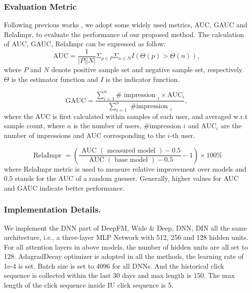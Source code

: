 \subsubsection{\textbf{Evaluation Metric}}
Following previous works \cite{din,dien,star,clid}, we adopt some widely used metrics, AUC, GAUC and RelaImpr, to evaluate the performance of our proposed method. 
The calculation of AUC, GAUC, RelaImpr can be expressed as follow:
\begin{equation}
\mathrm{AUC}=\frac{1}{|P||N|} \Sigma_{p \in P} \Sigma_{n \in N} I(\Theta(p)>\Theta(n)),
\end{equation}
where $P$ and $N$ denote positive sample set and negative sample set, respectively. $\Theta$ is the estimator function and $I$ is the indicator function.

\begin{equation}
\mathrm{GAUC}=\frac{\sum_{i=1}^n \# \text { impression }_i \times \mathrm{AUC}_i}{\sum_{i=1}^n \text { \#impression }_i},
\end{equation}
where the AUC is first calculated within samples of each user, and averaged w.r.t sample count, where $n$ is the number of users, \#impression $i$ and $\mathrm{AUC}_i$ are the number of impressions and AUC corresponding to the $i$-th user.

\begin{equation}
\text { RelaImpr }=\left(\frac{\text { AUC }(\text { measured model })-0.5}{\text { AUC }(\text { base model })-0.5}-1\right) \times 100 \%
\end{equation}
where RelaImpr metric is used to measure relative improvement over models and 0.5 stands for the AUC of a random guesser. Generally, higher values for AUC and GAUC indicate better performance.


\subsubsection{\textbf{Implementation Details.}}
We implement the DNN part of DeepFM, Wide \& Deep, DNN, DIN all the same architecture, i.e., a three-layer MLP Network with 512, 256 and 128 hidden units. For all attention layers in above models, the number of hidden units are all set to 128. AdagradDecay optimizer is adopted in all the methods, the learning
rate of 1e-4 is set. Batch size is set to 4096 for all DNNs. And the historical click sequence is collected within the last 30 days and max length is 150. The max length of the click sequence inside IU click sequence is 5.

